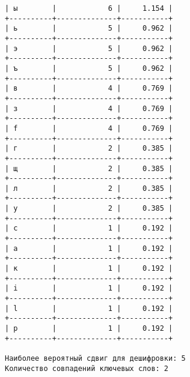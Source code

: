 \documentclass[a4paper, 14pt]{report}
\begin{document}
\begin{verbatim}
| ы        |            6 |     1.154 |
+----------+--------------+-----------+
| ь        |            5 |     0.962 |
+----------+--------------+-----------+
| э        |            5 |     0.962 |
+----------+--------------+-----------+
| ъ        |            5 |     0.962 |
+----------+--------------+-----------+
| в        |            4 |     0.769 |
+----------+--------------+-----------+
| з        |            4 |     0.769 |
+----------+--------------+-----------+
| f        |            4 |     0.769 |
+----------+--------------+-----------+
| г        |            2 |     0.385 |
+----------+--------------+-----------+
| щ        |            2 |     0.385 |
+----------+--------------+-----------+
| л        |            2 |     0.385 |
+----------+--------------+-----------+
| y        |            2 |     0.385 |
+----------+--------------+-----------+
| c        |            1 |     0.192 |
+----------+--------------+-----------+
| a        |            1 |     0.192 |
+----------+--------------+-----------+
| к        |            1 |     0.192 |
+----------+--------------+-----------+
| i        |            1 |     0.192 |
+----------+--------------+-----------+
| l        |            1 |     0.192 |
+----------+--------------+-----------+
| p        |            1 |     0.192 |
+----------+--------------+-----------+

Наиболее вероятный сдвиг для дешифровки: 5
Количество совпадений ключевых слов: 2
\end{verbatim}
\end{document}
